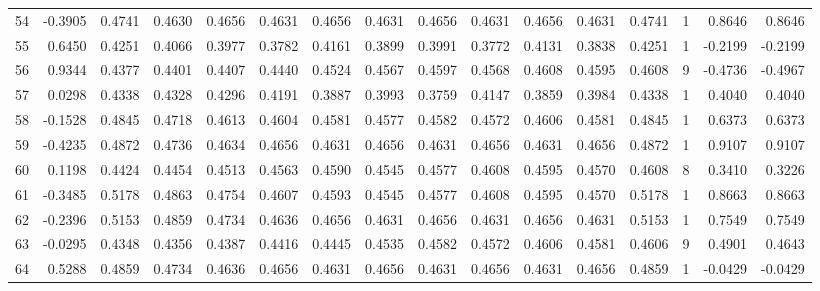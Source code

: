 \begin{tabular}{lrrrrrrrrrrrrrrr}
54  &     -0.3905 &  0.4741 &  0.4630 &  0.4656 &  0.4631 &  0.4656 &  0.4631 &  0.4656 &  0.4631 &  0.4656 &   0.4631 &     0.4741 &      1 &                    0.8646 &                     0.8646 \\
55  &      0.6450 &  0.4251 &  0.4066 &  0.3977 &  0.3782 &  0.4161 &  0.3899 &  0.3991 &  0.3772 &  0.4131 &   0.3838 &     0.4251 &      1 &                   -0.2199 &                    -0.2199 \\
56  &      0.9344 &  0.4377 &  0.4401 &  0.4407 &  0.4440 &  0.4524 &  0.4567 &  0.4597 &  0.4568 &  0.4608 &   0.4595 &     0.4608 &      9 &                   -0.4736 &                    -0.4967 \\
57  &      0.0298 &  0.4338 &  0.4328 &  0.4296 &  0.4191 &  0.3887 &  0.3993 &  0.3759 &  0.4147 &  0.3859 &   0.3984 &     0.4338 &      1 &                    0.4040 &                     0.4040 \\
58  &     -0.1528 &  0.4845 &  0.4718 &  0.4613 &  0.4604 &  0.4581 &  0.4577 &  0.4582 &  0.4572 &  0.4606 &   0.4581 &     0.4845 &      1 &                    0.6373 &                     0.6373 \\
59  &     -0.4235 &  0.4872 &  0.4736 &  0.4634 &  0.4656 &  0.4631 &  0.4656 &  0.4631 &  0.4656 &  0.4631 &   0.4656 &     0.4872 &      1 &                    0.9107 &                     0.9107 \\
60  &      0.1198 &  0.4424 &  0.4454 &  0.4513 &  0.4563 &  0.4590 &  0.4545 &  0.4577 &  0.4608 &  0.4595 &   0.4570 &     0.4608 &      8 &                    0.3410 &                     0.3226 \\
61  &     -0.3485 &  0.5178 &  0.4863 &  0.4754 &  0.4607 &  0.4593 &  0.4545 &  0.4577 &  0.4608 &  0.4595 &   0.4570 &     0.5178 &      1 &                    0.8663 &                     0.8663 \\
62  &     -0.2396 &  0.5153 &  0.4859 &  0.4734 &  0.4636 &  0.4656 &  0.4631 &  0.4656 &  0.4631 &  0.4656 &   0.4631 &     0.5153 &      1 &                    0.7549 &                     0.7549 \\
63  &     -0.0295 &  0.4348 &  0.4356 &  0.4387 &  0.4416 &  0.4445 &  0.4535 &  0.4582 &  0.4572 &  0.4606 &   0.4581 &     0.4606 &      9 &                    0.4901 &                     0.4643 \\
64  &      0.5288 &  0.4859 &  0.4734 &  0.4636 &  0.4656 &  0.4631 &  0.4656 &  0.4631 &  0.4656 &  0.4631 &   0.4656 &     0.4859 &      1 &                   -0.0429 &                    -0.0429 \\

\end{tabular}
